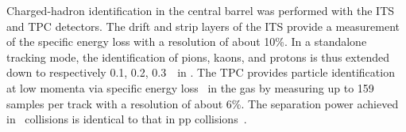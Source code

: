 Charged-hadron identification in the central barrel was performed with the ITS and TPC detectors. The drift and strip layers of the ITS provide a measurement of the specific energy loss with a resolution of about 10\%. In a standalone tracking mode, the identification of pions, kaons, and protons is thus extended down to respectively 0.1, 0.2, 0.3~\gevc\ in \pt. The TPC provides particle identification at low momenta via specific energy loss \dedx\ in the gas by measuring up to 159 samples per track with a resolution of about 6\%. The separation power achieved in \pPb\ collisions is identical to that in pp collisions~\cite{Abelev:2014ffa}.



